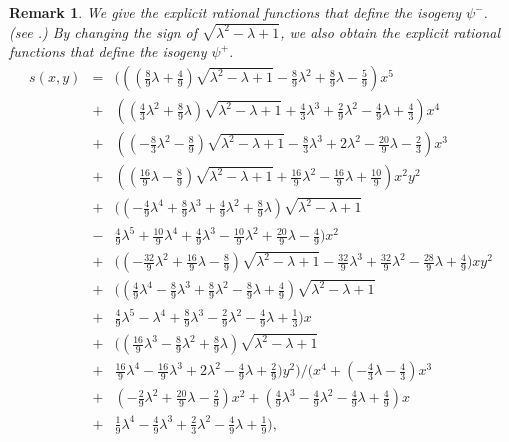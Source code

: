 \documentclass[a4paper, 11pt]{article}
\newtheorem{rem}[defn]{Remark}
\theoremstyle{plain}
\newcommand{\?}{\textcolor{red}{??}}
\newcommand{\lm}{\lambda}
\begin{document}
\begin{rem}
We give the explicit rational functions that define the isogeny $\psi^{-}$. (see \cite[5-1,5-2,5-3]{Github}.) By changing the sign of $\sqrt{\lm^2-\lm+1}$, we also obtain the explicit rational functions that define the isogeny $\psi^{+}$.
\footnotesize{
\begin{eqnarray*}
s(x,y)&=&\Biggl(\left(\left(\frac{8}{9} {\lm}  + \frac{4}{9}\right) \sqrt{{ {\lm} }^2- {\lm} +1}  - \frac{8}{9} {\lm} ^2 + \frac{8}{9} {\lm}  - \frac{5}{9}\right)x^5 \\ &+& \left(\left(\frac{4}{3} {\lm} ^2 + \frac{8}{9} {\lm} \right) \sqrt{{ {\lm} }^2- {\lm} +1}  + \frac{4}{3} {\lm} ^3 + \frac{2}{9} {\lm}^2 - \frac{4}{9} {\lm}  + \frac{4}{3} \right)x^4\\&+& \left(\left(-\frac{8}{3} {\lm} ^2 - \frac{8}{9}\right) \sqrt{{ {\lm} }^2- {\lm} +1}  - \frac{8}{3} {\lm} ^3 + 2 {\lm} ^2 - \frac{20}{9} {\lm}  - \frac{2}{3}\right)x^3\\&+& \left(\left(\frac{16}{9} {\lm}  - \frac{8}{9}\right) \sqrt{{ {\lm} }^2- {\lm} +1}  + \frac{16}{9} {\lm} ^2 - \frac{16}{9} {\lm}  + \frac{10}{9}\right)x^2y^2 \\&+& \biggl(\left(-\frac{4}{9} {\lm} ^4 + \frac{8}{9} {\lm} ^3 + \frac{4}{9} {\lm} ^2 + \frac{8}{9} {\lm} \right) \sqrt{{ {\lm} }^2- {\lm} +1} \\& -& \frac{4}{9} {\lm} ^5 + \frac{10}{9} {\lm} ^4 + \frac{4}{9} {\lm} ^3 -\frac{10}{9} {\lm} ^2 + \frac{20}{9} {\lm}  - \frac{4}{9}\biggr)x^2 \\&+& \biggl(\left(-\frac{32}{9} {\lm} ^2 + \frac{16}{9} {\lm}  - \frac{8}{9}\right) \sqrt{{ {\lm} }^2- {\lm} +1}  - \frac{32}{9} {\lm} ^3 + \frac{32}{9} {\lm} ^2 - \frac{28}{9} {\lm}  + \frac{4}{9}\biggr)xy^2 \\&+& \biggl(\left(\frac{4}{9} {\lm} ^4 - \frac{8}{9} {\lm} ^3 + \frac{8}{9} {\lm} ^2 - \frac{8}{9} {\lm}  + \frac{4}{9}\right) \sqrt{{ {\lm} }^2- {\lm} +1} \\& +& \frac{4}{9} {\lm} ^5 -  {\lm} ^4 + \frac{8}{9} {\lm} ^3 - \frac{2}{9} {\lm} ^2 - \frac{4}{9} {\lm}  + \frac{1}{3}\biggr)x \\ &+& \biggl(\left(\frac{16}{9} {\lm} ^3 -\frac{8}{9} {\lm} ^2 + \frac{8}{9} {\lm} \right) \sqrt{{ {\lm} }^2- {\lm} +1}  \\&+& \frac{16}{9} {\lm} ^4 - \frac{16}{9} {\lm} ^3 + 2 {\lm} ^2 - \frac{4}{9} {\lm}  + \frac{2}{9}\biggr)y^2\Biggr) \Bigg/ 
    \Biggl(x^4 + \left(-\frac{4}{3} {\lm}  - \frac{4}{3}\right)x^3\\ &+& \left(-\frac{2}{9} {\lm} ^2 + \frac{20}{9} {\lm}  - \frac{2}{9}\right)x^2 + \left(\frac{4}{9} {\lm} ^3 - \frac{4}{9} {\lm} ^2 - \frac{4}{9} {\lm}  + \frac{4}{9}\right)x \\ & +& \frac{1}{9} {\lm} ^4 - \frac{4}{9} {\lm} ^3 + \frac{2}{3} {\lm} ^2 - \frac{4}{9} {\lm}  + \frac{1}{9}\Biggr),

\end{eqnarray*}}
\end{rem}
\end{document}

